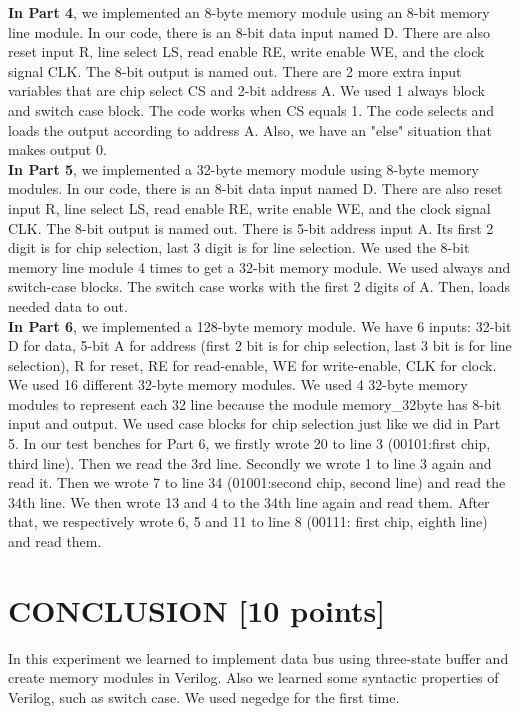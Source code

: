 \documentclass[pdftex,12pt,a4paper]{article}
\begin{document}
\textbf{In Part 4}, we implemented an 8-byte memory module using an 8-bit memory line module. In our code, there is an 8-bit data input named D. There are also reset input R, line select LS, read enable RE, write enable WE, and the clock signal CLK. The 8-bit output is named out. There are 2 more extra input variables that are chip select CS and 2-bit address A. We used 1 always block and switch case block. The code works when CS equals 1. The code selects and loads the output according to address A. Also, we have an "else" situation that makes output 0.\\

\textbf{In Part 5}, we implemented a 32-byte memory module using 8-byte memory modules. In our code, there is an 8-bit data input named D. There are also reset input R, line select LS, read enable RE, write enable WE, and the clock signal CLK. The 8-bit output is named out. There is 5-bit address input A. Its first 2 digit is for chip selection, last 3 digit is for line selection. We used the 8-bit memory line module 4 times to get a 32-bit memory module. We used always and switch-case blocks. The switch case works with the first 2 digits of A. Then, loads needed data to out.\\

\textbf{In Part 6}, we implemented a 128-byte memory module. We have 6 inputs: 32-bit D for data, 5-bit A for address (first 2 bit is for chip selection, last 3 bit is for line selection), R for reset, RE for read-enable, WE for write-enable, CLK for clock. We used 16 different 32-byte memory modules. We used 4 32-byte memory modules to represent each 32 line because the module memory\_32byte has 8-bit input and output. We used case blocks for chip selection just like we did in Part 5. 
In our test benches for Part 6, we firstly wrote 20 to line 3 (00101:first chip, third line). Then we read the 3rd line. Secondly we wrote 1 to line 3 again and read it. Then we wrote 7 to line 34 (01001:second chip, second line) and read the 34th line. We then wrote 13 and 4 to the 34th line again and read them. After that, we respectively wrote 6, 5 and 11 to line 8 (00111: first chip, eighth line) and read them.




\section{CONCLUSION [10 points]}
In this experiment we learned to implement data bus using three-state buffer and create memory modules in Verilog. Also we learned some syntactic properties of Verilog, such as switch case. We used negedge for the first time.
\end{document}
